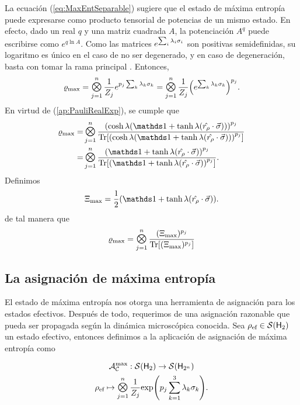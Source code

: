 La ecuación (\ref{eq:MaxEntSeparable}) sugiere que el estado de máxima entropía puede expresarse como producto tensorial de potencias de un mismo estado. En efecto, dado un real $q$ y una matriz cuadrada $A$, la potenciación $A^{q}$ puede escribirse como $e^{q \ln A}$. Como las matrices $e^{\sum_{i}\lambda_{i}\sigma_{i}}$ son positivas semidefinidas, su logaritmo es único en el caso de no ser degenerado, y en caso de degeneración, basta con tomar la rama principal \cite{log1,Davalos2019}. Entonces,
\begin{equation}
    \varrho_{\max}=\Motimes_{j=1}^{n}\frac{1}{Z_{j}}e^{p_{j}\sum_{k}\lambda_{k}\pauli{k}}=\Motimes_{j=1}^{n}\frac{1}{Z_{j}}\qty(e^{\sum_{k}\lambda_{k}\pauli{k}})^{p_{j}}.\nonumber
\end{equation}
En virtud de (\ref*{ap:PauliRealExp}), se cumple que
\begin{align}
  \varrho_{\max}=&\Motimes_{j=1}^{n}\frac{\qty(\cosh{\lambda}(\Id+\tanh{\lambda}(\paulivec{r_{\rho}})))^{p_{j}}}{\Tr[\qty(\cosh{\lambda}(\Id+\tanh{\lambda}(\paulivec{r_{\rho}})))^{p_{j}}]}\nonumber\\
  =&\Motimes_{j=1}^{n}\frac{\qty(\Id+\tanh{\lambda}(\paulivec{r_{\rho}}))^{p_{j}}}{\Tr[\qty(\Id+\tanh{\lambda}(\paulivec{r_{\rho}}))^{p_{j}}]}.\nonumber
\end{align}
Definimos
\begin{equation}\label{eq:Xi}
  \Xi_{\max}=\frac{1}{2}(\Id+\tanh{\lambda}(\paulivec{r_{\rho}})).
\end{equation}
de tal manera que 
\begin{equation}\label{eq:MaxEntSeparablePower}
  \varrho_{\max}=\Motimes_{j=1}^{n}\frac{(\Xi_{\max})^{p_{j}}}{\Tr[ (\Xi_{\max})^{p_{j}}]}
\end{equation}

\subsection{La asignación de máxima entropía}

El estado de máxima entropía nos otorga una herramienta de asignación para los estados efectivos. Después de todo, requerimos de una asignación razonable que pueda ser propagada según la dinámica microscópica conocida. Sea $\rho_{\text{ef}}\in\mathcal{S}({\sf H}_{2})$ un estado efectivo, entonces definimos a la aplicación de asignación de máxima entropía como

\begin{gather}\label{eq:MaxEntAss}
    \mcA_{\mcC}^{\max}:\densityspace{2}\rightarrow\densityspace{2^{n}}\nonumber\\
    \rho_{\ef} \mapsto \Motimes_{j=1}^{n}\frac{1}{Z_{j}}\text{exp}\qty(p_{j}\sum_{k=1}^{3}\lambda_{k}\sigma_{k}).
\end{gather}

